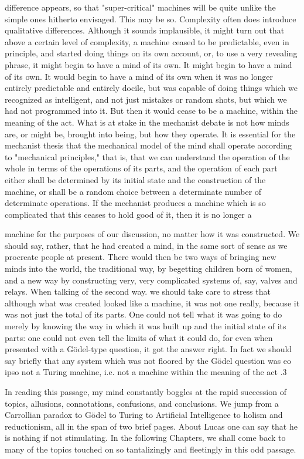   difference appears, so that "super-critical" machines will be quite unlike the simple ones
  hitherto envisaged.
        This may be so. Complexity often does introduce qualitative differences. Although it
  sounds implausible, it might turn out that above a certain level of complexity, a machine
  ceased to be predictable, even in principle, and started doing things on its own account, or,
  to use a very revealing phrase, it might begin to have a mind of its own. It might begin to
  have a mind of its own. It would begin to have a mind of its own when it was no longer
  entirely predictable and entirely docile, but was capable of doing things which we
  recognized as intelligent, and not just mistakes or random shots, but which we had not
  programmed into it. But then it would cease to be a machine, within the meaning of the act.
  What is at stake in the mechanist debate is not how minds are, or might be, brought into
  being, but how they operate. It is essential for the mechanist thesis that the mechanical
  model of the mind shall operate according to "mechanical principles," that is, that we can
  understand the operation of the whole in terms of the operations of its parts, and the
  operation of each part either shall be determined by its initial state and the construction of
  the machine, or shall be a random choice between a determinate number of determinate
  operations. If the mechanist produces a machine which is so complicated that this ceases to
  hold good of it, then it is no longer a





   machine for the purposes of our discussion, no matter how it was constructed. We should
   say, rather, that he had created a mind, in the same sort of sense as we procreate people at
   present. There would then be two ways of bringing new minds into the world, the
   traditional way, by begetting children born of women, and a new way by constructing very,
   very complicated systems of, say, valves and relays. When talking of the second way. we
   should take care to stress that although what was created looked like a machine, it was not
   one really, because it was not just the total of its parts. One could not tell what it was going
   to do merely by knowing the way in which it was built up and the initial state of its parts:
   one could not even tell the limits of what it could do, for even when presented with a
   Gödel-type question, it got the answer right. In fact we should say briefly that any system
   which was not floored by the Gödel question was eo ipso not a Turing machine, i.e. not a
   machine within the meaning of the act .3

   In reading this passage, my mind constantly boggles at the rapid succession of topics,
allusions, connotations, confusions, and conclusions. We jump from a Carrollian paradox
to Gödel to Turing to Artificial Intelligence to holism and reductionism, all in the span of
two brief pages. About Lucas one can say that he is nothing if not stimulating. In the
following Chapters, we shall come back to many of the topics touched on so tantalizingly
and fleetingly in this odd passage.





